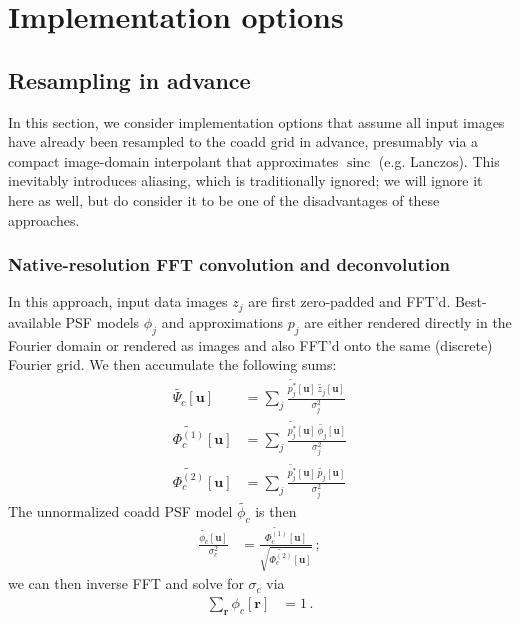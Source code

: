 \documentclass[DM,authoryear,toc]{lsstdoc}
\DeclareMathOperator{\sinc}{sinc}
\begin{document}
\section{Implementation options}

\label{sec:implementation-options}

\subsection{Resampling in advance}

In this section, we consider implementation options that assume all input images have already been resampled to the coadd grid in advance, presumably via a compact image-domain interpolant that approximates $\sinc$ (e.g. Lanczos).
This inevitably introduces aliasing, which is traditionally ignored; we will ignore it here as well, but do consider it to be one of the disadvantages of these approaches.

\subsubsection{Native-resolution FFT convolution and deconvolution}

In this approach, input data images $z_j$ are first zero-padded and FFT'd.
Best-available PSF models $\phi_j$ and approximations $p_j$ are either rendered directly in the Fourier domain or rendered as images and also FFT'd onto the same (discrete) Fourier grid.
We then accumulate the following sums:
\begin{align}
    \widetilde{\Psi_c}[\symbf{u}] &=
        \sum_j \frac{\widetilde{p_j^*}[\symbf{u}]\,\widetilde{z_j}[\symbf{u}]}{\sigma_j^2} \\
    \widetilde{\Phi_c^{(1)}}[\symbf{u}] &=
        \sum_j \frac{\widetilde{p_j^*}[\symbf{u}]\,\widetilde{\phi_j}[\symbf{u}]}{\sigma_j^2} \\
    \widetilde{\Phi_c^{(2)}}[\symbf{u}] &=
        \sum_j \frac{\widetilde{p_j^*}[\symbf{u}]\,\widetilde{p_j}[\symbf{u}]}{\sigma_j^2}
\end{align}
The unnormalized coadd PSF model $\widetilde{\phi_c}$ is then
\begin{align}
    \frac{\widetilde{\phi_c}[\symbf{u}]}{\sigma_c^2} &= \frac{
        \widetilde{\Phi_c^{(1)}}[\symbf{u}]
    }{
        \sqrt{\widetilde{\Phi_c^{(2)}}[\symbf{u}]}
    } \, ;
\end{align}
we can then inverse FFT and solve for $\sigma_c$ via
\begin{align}
    \sum_{\symbf{r}} \phi_c[\symbf{r}] &= 1 \, .
\end{align}
\end{document}
